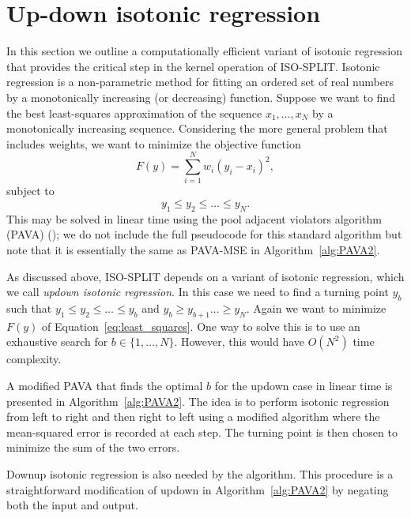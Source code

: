 \documentclass[10pt]{article}
\begin{document}
\begin{algorithm}
\begin{algorithmic}
\end{algorithmic}
\label{alg:PAVA2}
\end{algorithm}

\section {Up-down isotonic regression}
\label{appendixUpdown}

In this section we outline a computationally efficient variant of isotonic regression that provides the critical step in the kernel operation of ISO-SPLIT. Isotonic regression is a non-parametric method for fitting an ordered set of real numbers by a monotonically increasing (or decreasing) function. Suppose we want to find the best least-squares approximation of the sequence $x_1,\dots,x_N$ by a monotonically increasing sequence. Considering the more general problem that includes weights, we want to minimize the objective function
\begin{equation}
F(y)=\sum_{i=1}^N w_i(y_i-x_i)^2,
\label{eq:least_squares}
\end{equation}
subject to
$$y_1\leq y_2\leq\dots\leq y_N.$$
This may be solved in linear time using the pool adjacent violators algorithm (PAVA) (\cite{pava}); we do not include the full pseudocode for this standard algorithm but note that it is essentially the same as PAVA-MSE in Algorithm~\ref{alg:PAVA2}.

As discussed above, ISO-SPLIT depends on a variant of isotonic regression, which we call \emph{updown isotonic regression}. In this case we need to find a turning point $y_b$ such that $y_1\leq y_2\leq\dots\leq y_b$ and $y_b\geq y_{b+1}\dots\geq y_N$. Again we want to minimize $F(y)$ of Equation~\eqref{eq:least_squares}. One way to solve this is to use an exhaustive search for $b\in\{1,\dots,N\}$. However, this would have $O(N^2)$ time complexity.

A modified PAVA that finds the optimal $b$ for the updown case in linear time is presented in Algorithm~\ref{alg:PAVA2}. The idea is to perform isotonic regression from left to right and then right to left using a modified algorithm where the mean-squared error is recorded at each step. The turning point is then chosen to minimize the sum of the two errors.

Downup isotonic regression is also needed by the algorithm. This procedure is a straightforward modification of updown in Algorithm~\ref{alg:PAVA2} by negating both the input and output.
\end{document}
